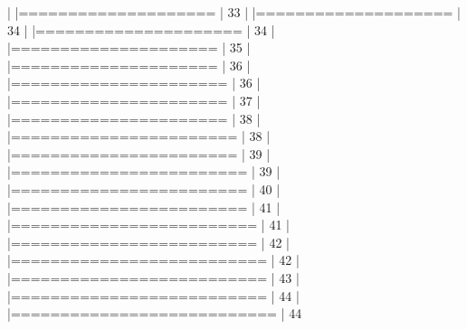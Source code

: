 \documentclass[article,nojss]{jss} %
\begin{document}
\begin{Schunk}
\begin{Soutput}
  |                                                                  
  |====================                                        |  33%
  |                                                                  
  |====================                                        |  34%
  |                                                                  
  |=====================                                       |  34%
  |                                                                  
  |=====================                                       |  35%
  |                                                                  
  |=====================                                       |  36%
  |                                                                  
  |======================                                      |  36%
  |                                                                  
  |======================                                      |  37%
  |                                                                  
  |======================                                      |  38%
  |                                                                  
  |=======================                                     |  38%
  |                                                                  
  |=======================                                     |  39%
  |                                                                  
  |========================                                    |  39%
  |                                                                  
  |========================                                    |  40%
  |                                                                  
  |========================                                    |  41%
  |                                                                  
  |=========================                                   |  41%
  |                                                                  
  |=========================                                   |  42%
  |                                                                  
  |==========================                                  |  42%
  |                                                                  
  |==========================                                  |  43%
  |                                                                  
  |==========================                                  |  44%
  |                                                                  
  |===========================                                 |  44%

\end{Soutput}
\end{Schunk}
\end{document}

